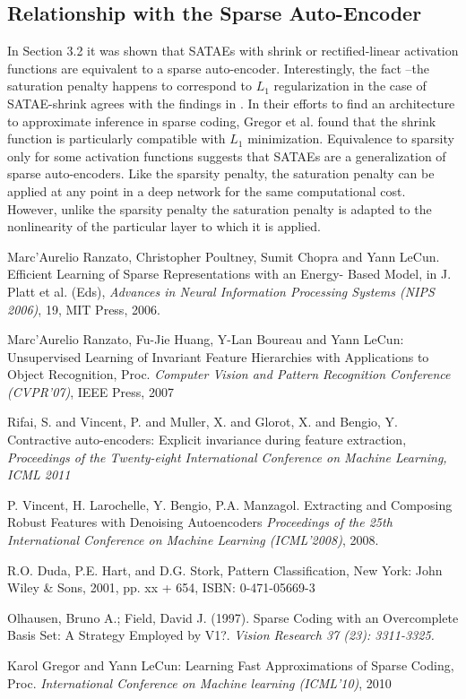 \documentclass{article} %
\begin{document}
 
\subsection{Relationship with the Sparse Auto-Encoder}
In Section 3.2 it was shown that SATAEs with shrink or rectified-linear activation functions are equivalent to a sparse auto-encoder. Interestingly, the fact --the saturation penalty happens to correspond to $L_1$ regularization in the case of SATAE-shrink agrees with the findings in \cite{LISTA}. In their efforts to find an architecture to approximate inference in sparse coding, Gregor et al. found that the shrink function is particularly compatible with $L_1$ minimization. Equivalence to sparsity only for some activation functions suggests that SATAEs are a generalization of sparse auto-encoders. Like the sparsity penalty, the saturation penalty can be applied at any point in a deep network for the same computational cost. However, unlike the sparsity penalty the saturation penalty is adapted to the nonlinearity of the particular layer to which it is applied. 
 
 \begin{thebibliography}{1}

 Marc'Aurelio Ranzato, Christopher Poultney, Sumit Chopra and Yann LeCun. Efficient Learning of Sparse Representations with an Energy-	   Based Model, in J. Platt et al. (Eds), {\em Advances in Neural Information Processing Systems (NIPS 2006)}, 19, MIT Press, 2006.

 Marc'Aurelio Ranzato, Fu-Jie Huang, Y-Lan Boureau and Yann LeCun: Unsupervised Learning of Invariant Feature Hierarchies with Applications to Object Recognition, Proc. {\em Computer Vision and Pattern Recognition Conference (CVPR'07)}, IEEE Press, 2007
 
 Rifai, S. and Vincent, P. and Muller, X. and Glorot, X. and Bengio, Y. Contractive auto-encoders: Explicit invariance during feature extraction, {\em Proceedings of the Twenty-eight International Conference on Machine Learning,  ICML 2011}

 P. Vincent, H. Larochelle, Y. Bengio, P.A. Manzagol. Extracting and Composing Robust Features with Denoising Autoencoders
{\em Proceedings of the 25th International Conference on Machine Learning (ICML'2008)}, 2008.

 R.O. Duda, P.E. Hart, and D.G. Stork, Pattern Classification, New York: John Wiley \& Sons, 2001, pp. xx + 654, ISBN: 0-471-05669-3

 Olhausen, Bruno A.; Field, David J. (1997). Sparse Coding with an Overcomplete Basis Set: A Strategy Employed by V1?. {\em Vision Research 37 (23): 3311-3325.}

 Karol Gregor and Yann LeCun: Learning Fast Approximations of Sparse Coding, Proc. {\em International Conference on Machine learning (ICML'10)}, 2010

\end{thebibliography}
\end{document}
